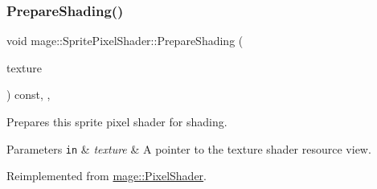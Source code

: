 \subsubsection{\texorpdfstring{Prepare\+Shading()}{PrepareShading()}}
{\footnotesize\ttfamily void mage\+::\+Sprite\+Pixel\+Shader\+::\+Prepare\+Shading (\begin{DoxyParamCaption}\item[{I\+D3\+D11\+Shader\+Resource\+View $\ast$}]{texture }\end{DoxyParamCaption}) const\hspace{0.3cm}{\ttfamily [final]}, {\ttfamily [override]}, {\ttfamily [virtual]}}

Prepares this sprite pixel shader for shading.


\begin{DoxyParams}[1]{Parameters}
\mbox{\tt in}  & {\em texture} & A pointer to the texture shader resource view. \\
\hline
\end{DoxyParams}


Reimplemented from \hyperlink{classmage_1_1_pixel_shader_ab677013145ca252c57e5a001134c01ff}{mage\+::\+Pixel\+Shader}.

